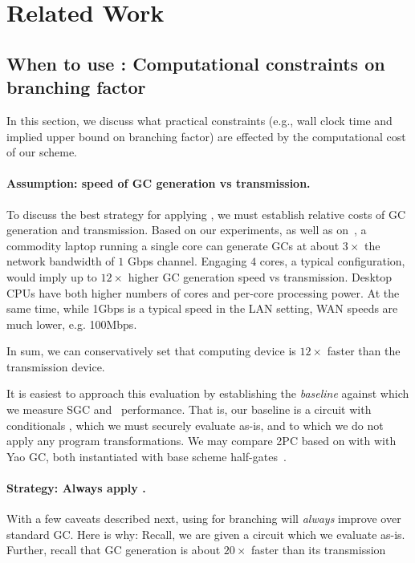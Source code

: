 \section{Related Work}\label{sec:relwork}

\subsection{When to use \ourscheme: Computational constraints on branching factor}

In this section, we discuss what practical constraints (e.g., wall clock time and implied upper bound on branching factor) are effected by the computational cost of our scheme. 

\paragraph{Assumption: speed of GC generation vs transmission.}  To discuss the best strategy for applying \ourscheme, we must establish relative costs of GC generation and transmission.  Based on our experiments, as well as on~\cite{XiaoPersonalComm}, a commodity laptop running a single core can generate GCs at about $3\times$ the network bandwidth of $1$ Gbps channel.  Engaging  $4$ cores, a typical configuration, would imply up to $12\times$ higher GC generation speed vs transmission.   Desktop CPUs have both higher numbers of cores and per-core processing power.  At the same time, while 1Gbps is a typical speed in the LAN setting, WAN speeds are much lower, e.g. 100Mbps.

In sum, we can conservatively set that computing device is $12\times$ faster than the transmission device.


\medskip

It is easiest to approach this evaluation by establishing the {\em baseline} against which we measure SGC and \ourscheme\ performance.    That is, our baseline is a circuit with conditionals \cir, which we must securely evaluate as-is, and to which we do not apply any program transformations.  We may compare 2PC based on \ourscheme with with Yao GC, both instantiated with base scheme half-gates~\cite{EC:ZahRosEva15}.



\paragraph{Strategy: Always apply \ourscheme.}  With a few caveats described next, using \ourscheme for branching will {\em always} improve over standard GC.  Here is why:  Recall, we are given a circuit \cir which we  evaluate as-is.  Further, recall that GC generation is about $20\times$ faster than its transmission 


